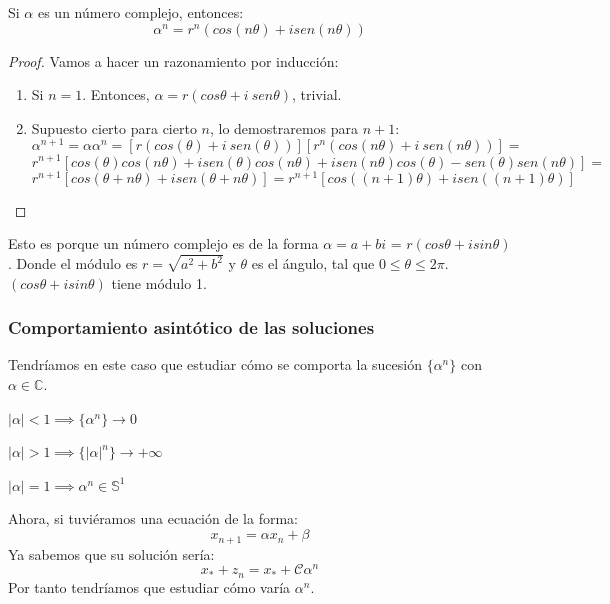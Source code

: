 \begin{nprop}
	Si $\alpha$ es un número complejo, entonces:
	\[
	\alpha^n = r^n(cos(n\theta) + i sen(n\theta))
	\]
	\begin{proof}
	Vamos a hacer un razonamiento por inducción:
	\begin{enumerate}
	\item Si $n=1$. Entonces, $\alpha = r(cos\theta +i \ sen\theta)$, trivial.
	\item Supuesto cierto para cierto $n$, lo demostraremos para $n+1$:
	\[
	\alpha^{n+1} = \alpha\alpha^n =  [r(cos(\theta) +i \ sen(\theta))] [r^n(cos(n\theta) +i\ sen(n\theta))]=
	\]
	\[
	r^{n+1}[cos(\theta) cos(n\theta) +i sen(\theta) cos(n\theta) + isen(n\theta) cos(\theta) - sen(\theta) sen(n\theta)] = \]
	\[r^{n+1}[cos(\theta+n\theta)+isen(\theta+n\theta)] = r^{n+1}[cos((n+1)\theta)+isen((n+1)\theta)]
	\]
\end{enumerate}

\end{proof}
\end{nprop}

\begin{nota}
	Esto es porque un número complejo es de la forma $\alpha = a+bi$ = $r(cos\theta + i sin\theta)$.
	Donde el módulo es $r=\sqrt{a^2 + b^2}$ y $\theta$ es el ángulo, tal que $0 \leq \theta \leq 2\pi$.
	$(cos\theta + i sin\theta)$ tiene módulo 1.

\end{nota}

\subsubsection{Comportamiento asintótico de las soluciones}
Tendríamos en este caso que estudiar cómo se comporta la sucesión $\{\alpha^n\}$ con $\alpha \in \mathbb{C}$.
\begin{nprop}\hfill
\begin{nlist}
	\item $|\alpha|< 1 \implies \{\alpha^n\}\to 0$
	\item $|\alpha|> 1 \implies \{|\alpha|^n\}\to +\infty$
	\item $|\alpha| = 1 \implies \alpha^n \in \mathbb{S}^1$
\end{nlist}

\end{nprop}

Ahora, si tuviéramos una ecuación de la forma:
\[
x_{n+1}= \alpha x_n + \beta
\]
Ya sabemos que su solución sería:
\[
x_* +z_n = x_* + \mathcal{C}\alpha^n
\]
Por tanto tendríamos que estudiar cómo varía $\alpha^n$.


